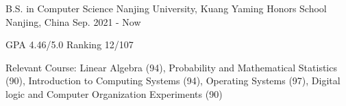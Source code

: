 

\begin{cventries}

  \cventry
    {B.S. in Computer Science} %
    {Nanjing University, Kuang Yaming Honors School} %
    {Nanjing, China} %
    {Sep. 2021 - Now} %
    {
      \begin{cvitems} %
        \item {GPA 4.46/5.0 Ranking 12/107}
        \item {Relevant Course: Linear Algebra (94), Probability and Mathematical Statistics (90), Introduction to Computing Systems (94), Operating Systems (97), Digital logic and Computer Organization Experiments (90)}
      \end{cvitems}
    }

\end{cventries}
